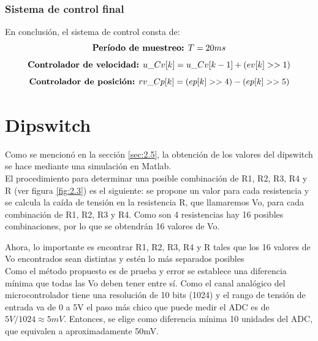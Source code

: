\subsubsection{Sistema de control final}

En conclusión, el sistema de control consta de:
 \[ \text{\textbf{Período de muestreo:} }  T = 20ms \]
\begin{equation} \label{eq:\theequation}
\text{\textbf{Controlador de velocidad:} } u\_Cv[k] = u\_Cv[k-1] + (ev[k] >> 1)
\end{equation}
\begin{equation} \label{eq:\theequation}
\text{\textbf{Controlador de posición:} } rv\_Cp[k] = (ep[k] >> 4) - (ep[k] >> 5)
\end{equation}


\section{Dipswitch} \label{sec:\thesection}
Como se mencionó en la sección \ref{sec:2.5}, la obtención de los valores del dipswitch se hace mediante una simulación en Matlab.\\
El procedimiento para determinar una posible combinación de R1, R2, R3, R4 y R (ver figura \ref{fig:2.3}) es el siguiente: se propone un valor para cada resistencia y se calcula la caída de tensión en la resistencia R, que llamaremos Vo, para cada combinación de R1, R2, R3 y R4. Como son 4 resistencias hay 16 posibles combinaciones, por lo que se obtendrán 16 valores de Vo. 

Ahora, lo importante es encontrar R1, R2, R3, R4 y R tales que los 16 valores de Vo encontrados sean distintas y estén lo más separados posibles\\
Como el método propuesto es de prueba y error se establece una diferencia mínima que todas las Vo deben tener entre sí. Como el canal analógico del microcontrolador tiene una resolución de 10 bits (1024) y el rango de tensión de entrada va de 0 a 5V el paso más chico que puede medir el ADC es de \(5V/1024 \approx 5mV\). Entonces, se elige como diferencia mínima 10 unidades del ADC, que equivalen a aproximadamente 50mV.

